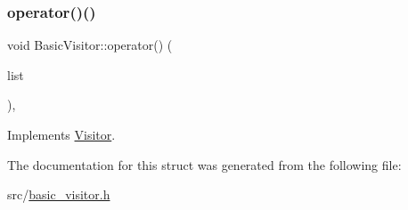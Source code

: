 \subsubsection{\texorpdfstring{operator()()}{operator()()}\hspace{0.1cm}{\footnotesize\ttfamily [59/59]}}
{\footnotesize\ttfamily void Basic\+Visitor\+::operator() (\begin{DoxyParamCaption}\item[{const \hyperlink{struct_formal_parameter_list}{Formal\+Parameter\+List} \&}]{list }\end{DoxyParamCaption})\hspace{0.3cm}{\ttfamily [inline]}, {\ttfamily [virtual]}}



Implements \hyperlink{struct_visitor_a1481a506dd79cc99d06ea9ebd2ac08ad}{Visitor}.



The documentation for this struct was generated from the following file\+:\begin{DoxyCompactItemize}
\item 
src/\hyperlink{basic__visitor_8h}{basic\+\_\+visitor.\+h}\end{DoxyCompactItemize}
